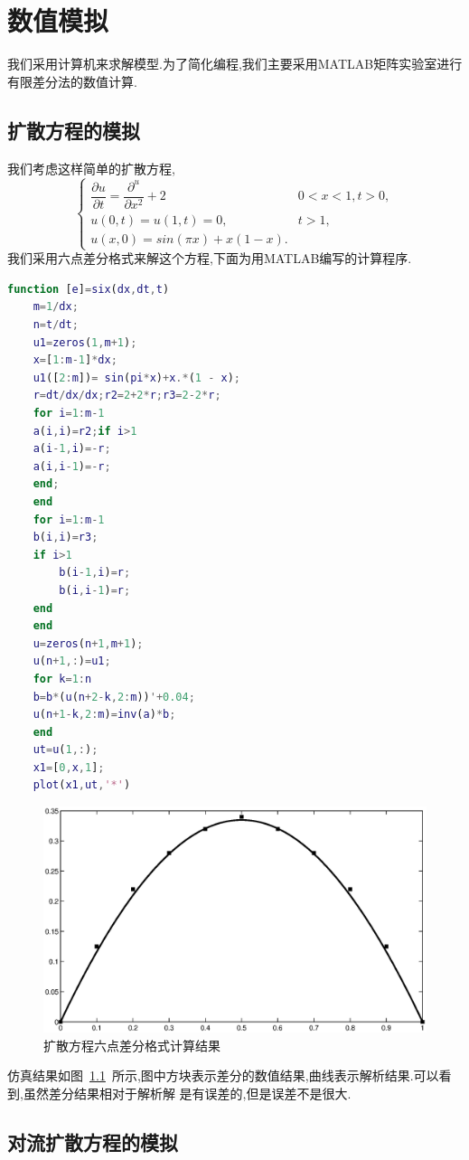 \chapter{数值模拟}
我们采用计算机来求解模型.为了简化编程,我们主要采用MATLAB矩阵实验室进行有限差分法的数值计算.\par
\section{扩散方程的模拟}
我们考虑这样简单的扩散方程,
\begin{equation}
\begin{cases}
\dfrac{\partial u}{\partial t}=\dfrac{\partial^ u}{\partial x^2}+2 & 0<x<1,t>0, \\
u(0,t)=u(1,t)=0,& t>1, \\
u(x,0)=sin(\pi x)+x(1-x).
\end{cases}
\end{equation}
我们采用六点差分格式来解这个方程,下面为用MATLAB编写的计算程序.
 \begin{lstlisting}[caption=六点差分格式,language=Matlab]
function [e]=six(dx,dt,t)
    m=1/dx;
    n=t/dt;
    u1=zeros(1,m+1);
    x=[1:m-1]*dx;
    u1([2:m])= sin(pi*x)+x.*(1 - x);
    r=dt/dx/dx;r2=2+2*r;r3=2-2*r;
    for i=1:m-1
	a(i,i)=r2;if i>1
	a(i-1,i)=-r;
	a(i,i-1)=-r;
	end;
    end
    for i=1:m-1
	b(i,i)=r3;
	if i>1
	    b(i-1,i)=r;
	    b(i,i-1)=r;
	end
    end
    u=zeros(n+1,m+1);
    u(n+1,:)=u1;
    for k=1:n
	b=b*(u(n+2-k,2:m))'+0.04;
	u(n+1-k,2:m)=inv(a)*b;
    end
    ut=u(1,:);
    x1=[0,x,1];
    plot(x1,ut,'*')
\end{lstlisting}
\begin{figure}[h]
 \centering
 \includegraphics[scale=0.65]{./pic/6dcf.eps}
 \caption{扩散方程六点差分格式计算结果\label{fig:sm_ldcf}}
\end{figure}\par
仿真结果如图~\ref{fig:sm_ldcf}~所示,图中方块表示差分的数值结果,曲线表示解析结果.可以看到,虽然差分结果相对于解析解
是有误差的,但是误差不是很大.\newpage
\section{对流扩散方程的模拟}

